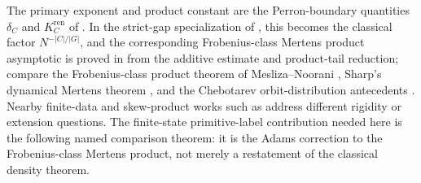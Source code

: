 The primary exponent and product constant are the Perron-boundary quantities
\(\delta_C\) and \(K_C^{\mathrm{ren}}\) of
.  In the strict-gap specialization
of , this becomes the classical factor
\(N^{-|C|/|G|}\), and the corresponding Frobenius-class Mertens product
asymptotic is proved in  from the
additive estimate and product-tail reduction; compare the Frobenius-class product
theorem of Mesliza--Noorani \cite{MeslizaNoorani1999FrobeniusMertens},
Sharp's dynamical Mertens theorem \cite{Sharp1991Mertens}, and the Chebotarev
orbit-distribution antecedents
\cite{ParryPollicott1986Chebotarev,NooraniParry1992ChebotarevShifts}.
Nearby finite-data and skew-product works such as
\cite{CrismaleDelVecchioGrisetaRossi2025NoncommutativeSkewProduct,OHare2025FiniteDataRigidity,Epperlein2026FreeInertGSFTs,NordinNooraniMohd2024OrbitGrowthSoficPFT,DeJong2026PeriodicOrbitLengths}
address different rigidity or extension questions.  The finite-state
primitive-label contribution needed here is the following named comparison
theorem: it is the Adams correction to the Frobenius-class Mertens product,
not merely a restatement of the classical density theorem.

